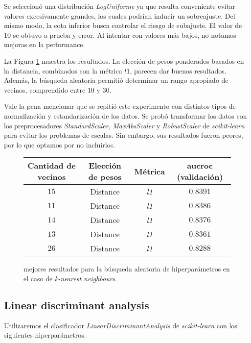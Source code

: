 Se seleccionó una distribución \textit{LogUniforme} ya que resulta conveniente evitar valores excesivamente grandes, los cuales podrían inducir un sobreajuste. Del mismo modo, la cota inferior busca controlar el riesgo de subajuste. El valor de $10$ se obtuvo a prueba y error. Al intentar con valores más bajos, no notamos mejoras en la performance. 

La Figura \ref{knn} muestra los resultados. La elección de pesos ponderados basados en la distancia, combinados con la métrica $l1$, parecen dar buenos resultados. Además, la búsqueda aleatoria permitió determinar un rango apropiado de vecinos, comprendido entre $10$ y $30$.

Vale la pena mencionar que se repitió este experimento con distintos tipos de normalización y estandarización de los datos. Se probó transformar los datos con los preprocesadores \textit{StandardScaler}, \textit{MaxAbsScaler} y \textit{RobustScaler} de \textit{scikit-learn} para evitar los problemas de escalas. Sin embargo, sus resultados fueron peores, por lo que optamos por no incluirlos.
  
\vspace{0.5em}
\begin{figure}[!htbp]
    \begin{center}
        \begin{tabular}{ |c|c|c|c| } 
         \hline
        Cantidad de vecinos & Elección de pesos & Métrica & aucroc (validación) \\
        \hline
        $15$             & Distance          & \textit{l1} & $0.8391$  \\ 
        $11$             & Distance          & \textit{l1} & $0.8386$  \\
        $14$             & Distance          & \textit{l1} & $0.8376$  \\ 
        $13$             & Distance          & \textit{l1} & $0.8361$  \\
        $26$             & Distance          & \textit{l1} & $0.8288$  \\ 
        \hline
        \end{tabular}
    \end{center}
    \caption{mejores resultados para la búsqueda aleatoria de hiperparámetros en el caso de \textit{k-nearest neighbours}.} \label{knn}
\end{figure}

\subsection{Linear discriminant analysis}
Utilizaremos el clasificador \textit{LinearDiscriminantAnalysis} de \textit{scikit-learn} con los siguientes hiperparámetros. 

